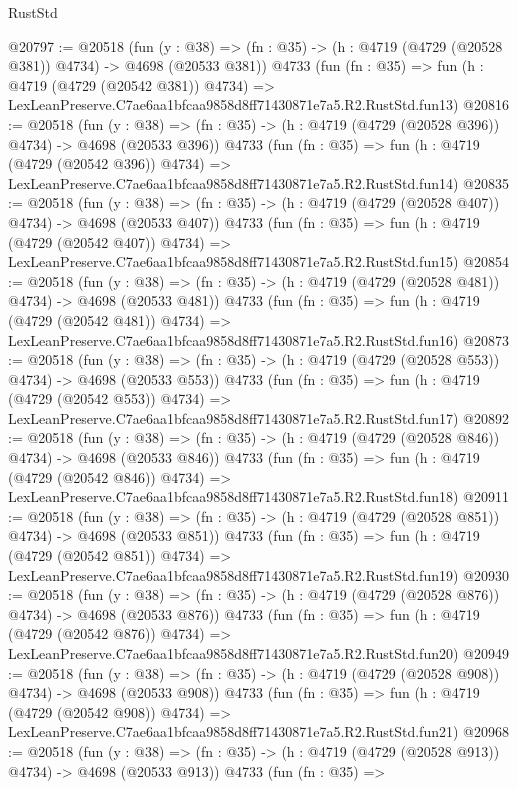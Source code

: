 \begin{lexlean}{RustStd}
\begin{coremodule}
@20797 := @20518
    (fun (y : @38) => (fn : @35) -> (h : @4719 (@4729 (@20528 @381)) @4734) -> @4698 (@20533 @381))
    @4733
    (fun (fn : @35) =>
    fun (h : @4719 (@4729 (@20542 @381)) @4734) =>
    LexLeanPreserve.C7ae6aa1bfcaa9858d8ff71430871e7a5.R2.RustStd.fun13)
@20816 := @20518
    (fun (y : @38) => (fn : @35) -> (h : @4719 (@4729 (@20528 @396)) @4734) -> @4698 (@20533 @396))
    @4733
    (fun (fn : @35) =>
    fun (h : @4719 (@4729 (@20542 @396)) @4734) =>
    LexLeanPreserve.C7ae6aa1bfcaa9858d8ff71430871e7a5.R2.RustStd.fun14)
@20835 := @20518
    (fun (y : @38) => (fn : @35) -> (h : @4719 (@4729 (@20528 @407)) @4734) -> @4698 (@20533 @407))
    @4733
    (fun (fn : @35) =>
    fun (h : @4719 (@4729 (@20542 @407)) @4734) =>
    LexLeanPreserve.C7ae6aa1bfcaa9858d8ff71430871e7a5.R2.RustStd.fun15)
@20854 := @20518
    (fun (y : @38) => (fn : @35) -> (h : @4719 (@4729 (@20528 @481)) @4734) -> @4698 (@20533 @481))
    @4733
    (fun (fn : @35) =>
    fun (h : @4719 (@4729 (@20542 @481)) @4734) =>
    LexLeanPreserve.C7ae6aa1bfcaa9858d8ff71430871e7a5.R2.RustStd.fun16)
@20873 := @20518
    (fun (y : @38) => (fn : @35) -> (h : @4719 (@4729 (@20528 @553)) @4734) -> @4698 (@20533 @553))
    @4733
    (fun (fn : @35) =>
    fun (h : @4719 (@4729 (@20542 @553)) @4734) =>
    LexLeanPreserve.C7ae6aa1bfcaa9858d8ff71430871e7a5.R2.RustStd.fun17)
@20892 := @20518
    (fun (y : @38) => (fn : @35) -> (h : @4719 (@4729 (@20528 @846)) @4734) -> @4698 (@20533 @846))
    @4733
    (fun (fn : @35) =>
    fun (h : @4719 (@4729 (@20542 @846)) @4734) =>
    LexLeanPreserve.C7ae6aa1bfcaa9858d8ff71430871e7a5.R2.RustStd.fun18)
@20911 := @20518
    (fun (y : @38) => (fn : @35) -> (h : @4719 (@4729 (@20528 @851)) @4734) -> @4698 (@20533 @851))
    @4733
    (fun (fn : @35) =>
    fun (h : @4719 (@4729 (@20542 @851)) @4734) =>
    LexLeanPreserve.C7ae6aa1bfcaa9858d8ff71430871e7a5.R2.RustStd.fun19)
@20930 := @20518
    (fun (y : @38) => (fn : @35) -> (h : @4719 (@4729 (@20528 @876)) @4734) -> @4698 (@20533 @876))
    @4733
    (fun (fn : @35) =>
    fun (h : @4719 (@4729 (@20542 @876)) @4734) =>
    LexLeanPreserve.C7ae6aa1bfcaa9858d8ff71430871e7a5.R2.RustStd.fun20)
@20949 := @20518
    (fun (y : @38) => (fn : @35) -> (h : @4719 (@4729 (@20528 @908)) @4734) -> @4698 (@20533 @908))
    @4733
    (fun (fn : @35) =>
    fun (h : @4719 (@4729 (@20542 @908)) @4734) =>
    LexLeanPreserve.C7ae6aa1bfcaa9858d8ff71430871e7a5.R2.RustStd.fun21)
@20968 := @20518
    (fun (y : @38) => (fn : @35) -> (h : @4719 (@4729 (@20528 @913)) @4734) -> @4698 (@20533 @913))
    @4733
    (fun (fn : @35) =>

\end{coremodule}
\end{lexlean}
